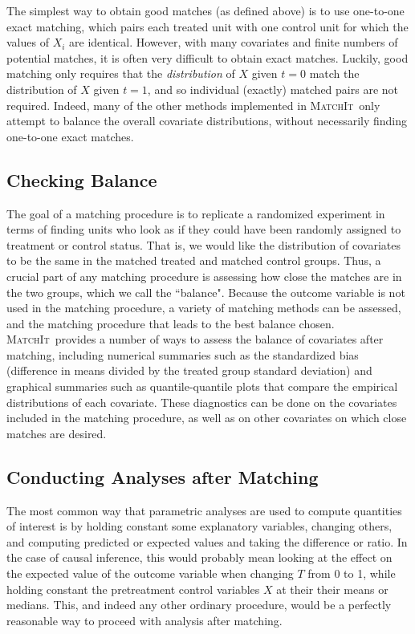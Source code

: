 \documentclass[oneside,letterpaper,titlepage]{article}
\newcommand{\MatchIt}{\textsc{MatchIt}}
\begin{document}
The simplest way to obtain good matches (as defined above) is to use
one-to-one exact matching, which pairs each treated unit with one
control unit for which the values of $X_i$ are identical.  However,
with many covariates and finite numbers of potential matches, it is
often very difficult to obtain exact matches.  Luckily, good matching
only requires that the \emph{distribution} of $X$ given $t=0$ match
the distribution of $X$ given $t=1$, and so individual (exactly)
matched pairs are not required.  Indeed, many of the other methods
implemented in \MatchIt\ only attempt to balance the overall covariate
distributions, without necessarily finding one-to-one exact matches.

\subsection{Checking Balance}

The goal of a matching procedure is to replicate a randomized
experiment in terms of finding units who look as if they could have
been randomly assigned to treatment or control status.  That is, we
would like the distribution of covariates to be the same in the
matched treated and matched control groups. Thus, a crucial part of
any matching procedure is assessing how close the matches are in the
two groups, which we call the ``balance".  Because the outcome
variable is not used in the matching procedure, a variety of matching
methods can be assessed, and the matching procedure that leads to the
best balance chosen.  \MatchIt\ provides a number of ways to assess
the balance of covariates after matching, including numerical
summaries such as the standardized bias (difference in means divided
by the treated group standard deviation) and graphical summaries such
as quantile-quantile plots that compare the empirical distributions of
each covariate.  These diagnostics can be done on the covariates
included in the matching procedure, as well as on other covariates on
which close matches are desired.

\subsection{Conducting Analyses after Matching}

The most common way that parametric analyses are used to compute
quantities of interest is by holding constant some explanatory
variables, changing others, and computing predicted or expected values
and taking the difference or ratio.  In the case of causal inference,
this would probably mean looking at the effect on the expected value
of the outcome variable when changing $T$ from 0 to 1, while holding
constant the pretreatment control variables $X$ at their their means
or medians.  This, and indeed any other ordinary procedure, would be a
perfectly reasonable way to proceed with analysis after matching.
\end{document}
